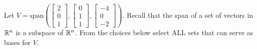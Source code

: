 \documentclass{ximera}
\author{}
\begin{document}
\begin{exercise}
Let $V=\text{span}\left(\begin{bmatrix}2\\0\\1\end{bmatrix},\begin{bmatrix}0\\1\\1\end{bmatrix}, \begin{bmatrix}-4\\0\\-2\end{bmatrix}\right)$.
Recall that the span of a set of vectors in $\mathbb{R}^n$ is a subspace of $\mathbb{R}^n$.  From the choices below select ALL sets that can serve as bases for $V$.

\begin{selectAll}
  \end{selectAll}
\end{exercise}
\end{document}
